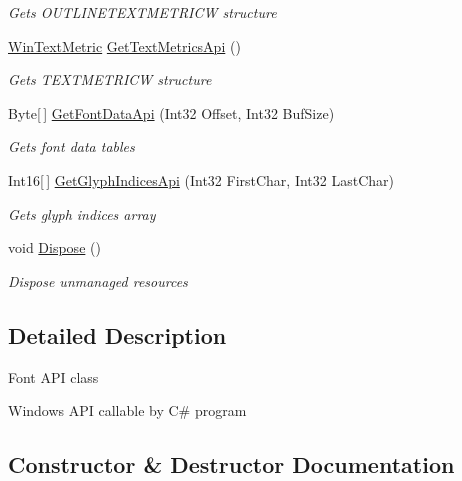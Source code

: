 \begin{DoxyCompactItemize}
\begin{DoxyCompactList}\small\item\em Gets O\+U\+T\+L\+I\+N\+E\+T\+E\+X\+T\+M\+E\+T\+R\+I\+CW structure \end{DoxyCompactList}\item 
\hyperlink{class_pdf_file_writer_1_1_win_text_metric}{Win\+Text\+Metric} \hyperlink{class_pdf_file_writer_1_1_font_api_a4004782e3fcd57caa7f3fff6ea48c852}{Get\+Text\+Metrics\+Api} ()
\begin{DoxyCompactList}\small\item\em Gets T\+E\+X\+T\+M\+E\+T\+R\+I\+CW structure \end{DoxyCompactList}\item 
Byte\mbox{[}$\,$\mbox{]} \hyperlink{class_pdf_file_writer_1_1_font_api_a046c0a794e59280b623eb561ef3d99d1}{Get\+Font\+Data\+Api} (Int32 Offset, Int32 Buf\+Size)
\begin{DoxyCompactList}\small\item\em Gets font data tables \end{DoxyCompactList}\item 
Int16\mbox{[}$\,$\mbox{]} \hyperlink{class_pdf_file_writer_1_1_font_api_a0df7c5a394f25b70cf42ad36ddde51c7}{Get\+Glyph\+Indices\+Api} (Int32 First\+Char, Int32 Last\+Char)
\begin{DoxyCompactList}\small\item\em Gets glyph indices array \end{DoxyCompactList}\item 
void \hyperlink{class_pdf_file_writer_1_1_font_api_a423747d05cf502cc42311adabccc8d57}{Dispose} ()
\begin{DoxyCompactList}\small\item\em Dispose unmanaged resources \end{DoxyCompactList}\end{DoxyCompactItemize}


\subsection{Detailed Description}
Font A\+PI class 

Windows A\+PI callable by C\# program 

\subsection{Constructor \& Destructor Documentation}
